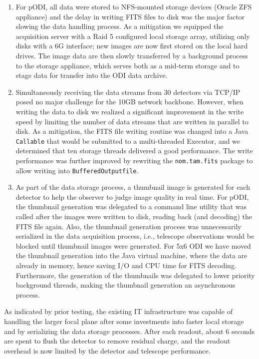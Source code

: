 \documentclass[]{spieman}
\begin{document}
\begin{enumerate} 
    
\item For pODI, all data were stored to NFS-mounted storage devices (Oracle ZFS
appliance) and the delay in  writing FITS files to disk was the major factor 
slowing the data handling process. As a mitigation we equipped the acquisition
server with a Raid 5 configured local storage array, utilizing only disks with a
6G interface; new images are now first stored on the local hard drives. The
image data are then slowly transferred by a background process to the storage
appliance, which serves both as a mid-term storage and to stage data for transfer into the
ODI data archive.

\item   Simultaneously receiving the data streams from 30 detectors via
TCP/IP posed no major challenge for the 10GB network backbone.  However, when
writing the data to disk we realized a significant  improvement in the write
speed by limiting the number of data streams that are written in parallel to
disk. As a mitigation, the FITS file writing routine was changed into a Java
{\tt Callable} that would be submitted to a multi-threaded Executor, and we
determined that ten storage threads delivered a good performance. The write
performance was further improved by rewriting the {\tt nom.tam.fits} package to
allow writing into {\tt BufferedOutputfile}.

\item As part of the data storage process, a thumbnail image is generated for
each detector to help the observer to judge image quality in real time. For
pODI, the thumbnail generation was delegated to a command line utility that was
called after the images were written to disk, reading back (and decoding) the
FITS file again. Also, the thumbnail generation process was unnecessarily
serialized in the data acquisition process, i.e., telescope observations would
be blocked until thumbnail images were generated.  For 5x6 ODI we have moved the
thumbnail generation into the Java virtual machine, where the data are already in
memory, hence saving I/O and CPU time for FITS decoding. Furthermore, the
generation of the thumbnails was delegated to  lower priority background
threads, making the thumbnail generation an asynchronous process.

    
\end{enumerate}

As indicated by prior testing, the existing IT infrastructure was capable of
handling the larger focal plane after some investments into faster local storage
and by serializing the data storage  processes.  After each readout, about 6
seconds are spent to flush the detector to remove residual charge, and the
readout overhead is now limited by the detector and telescope performance.
\end{document}
